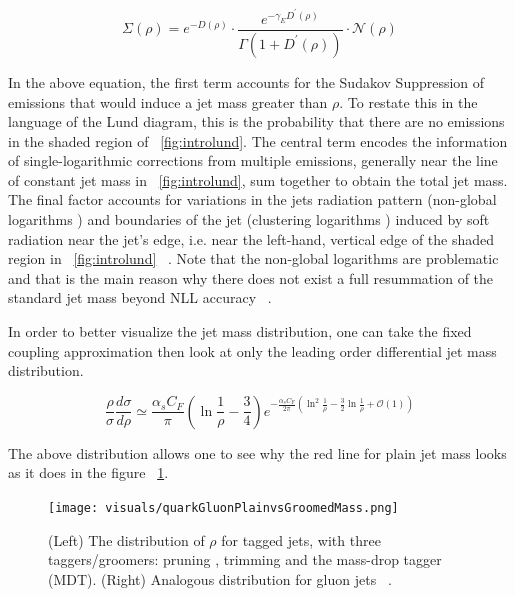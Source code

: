 \begin{equation}
\Sigma(\rho)=e^{-D(\rho)} \cdot \frac{e^{-\gamma_{E} D^{\prime}(\rho)}}{\Gamma\left(1+D^{\prime}(\rho)\right)} \cdot \mathcal{N}(\rho)
\end{equation}

In the above equation, the first term accounts for the Sudakov Suppression of emissions that would induce a jet mass greater than $\rho$. To restate this in the language of the Lund diagram, this is the probability that there are no emissions in the shaded region of ~\ref{fig:introlund}. The central term encodes the information of single-logarithmic corrections from multiple emissions, generally near the line of constant jet mass in ~\ref{fig:introlund}, sum together to obtain the total jet mass. The final factor accounts for variations in the jets radiation pattern (non-global logarithms ) and boundaries of the jet (clustering logarithms ) induced by soft radiation near the jet’s edge, i.e. near the left-hand, vertical edge of the shaded region in  ~\ref{fig:introlund} ~\cite{mmdt}. Note that the non-global logarithms are problematic and that is the main reason why there does not exist a full resummation of the standard jet mass beyond NLL accuracy ~\cite{mmdt}.


In order to better visualize the jet mass distribution, one can take the fixed coupling approximation then look at only the leading order differential jet mass distribution.~\cite{mmdt}

\begin{equation}
\frac{\rho}{\sigma} \frac{d \sigma}{d \rho} \simeq \frac{\alpha_{s} C_{F}}{\pi}\left(\ln \frac{1}{\rho}-\frac{3}{4}\right) e^{-\frac{\alpha_{s} C_{F}}{2 \pi}\left(\ln ^{2} \frac{1}{\rho}-\frac{3}{2} \ln \frac{1}{\rho}+\mathcal{O}(1)\right)}
\end{equation}

The above distribution allows one to see why the red line for plain jet mass looks as it does in the figure ~\ref{fig:quarkGluonPlainvsGroomedMass}.

\begin{figure}[htb]
\centering
\texttt{[image: visuals/quarkGluonPlainvsGroomedMass.png]}
\caption{(Left) The distribution of $\rho$ for tagged jets, with three taggers/groomers: pruning , trimming and the mass-drop tagger (MDT). (Right) Analogous distribution for gluon jets ~\cite{mmdt}.}
\label{fig:quarkGluonPlainvsGroomedMass}
\end{figure}



